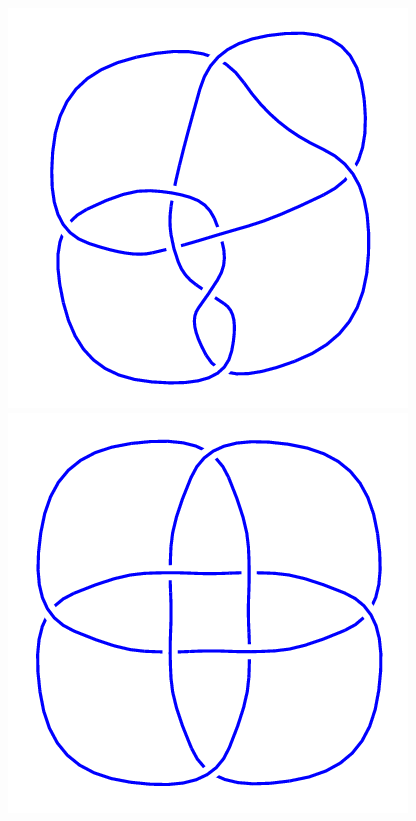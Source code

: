\begin{figure}[H]
    \begin{minipage}[b]{.18\linewidth}
        \centering
        \includegraphics[width=\linewidth]{../data/8_17.png}
    \end{minipage}
    \begin{minipage}[b]{.18\linewidth}
        \centering
        \includegraphics[width=\linewidth]{../data/8_18.png}

\end{minipage}
\end{figure}
